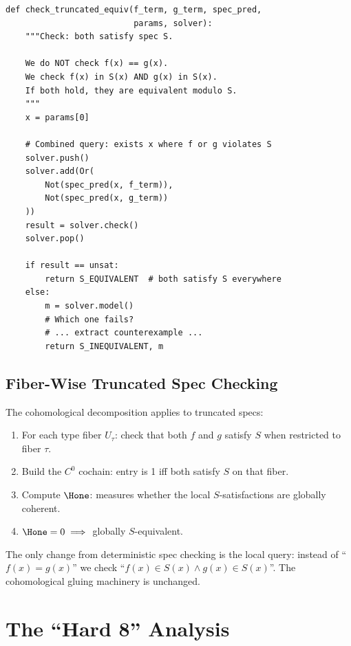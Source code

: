 \begin{lstlisting}[caption={Truncated spec check}]
def check_truncated_equiv(f_term, g_term, spec_pred,
                          params, solver):
    """Check: both satisfy spec S.

    We do NOT check f(x) == g(x).
    We check f(x) in S(x) AND g(x) in S(x).
    If both hold, they are equivalent modulo S.
    """
    x = params[0]

    # Combined query: exists x where f or g violates S
    solver.push()
    solver.add(Or(
        Not(spec_pred(x, f_term)),
        Not(spec_pred(x, g_term))
    ))
    result = solver.check()
    solver.pop()

    if result == unsat:
        return S_EQUIVALENT  # both satisfy S everywhere
    else:
        m = solver.model()
        # Which one fails?
        # ... extract counterexample ...
        return S_INEQUIVALENT, m
\end{lstlisting}

\subsection{Fiber-Wise Truncated Spec Checking}

The cohomological decomposition applies to truncated specs:

\begin{enumerate}
  \item For each type fiber $U_\tau$: check that both $f$ and $g$
    satisfy $S$ when restricted to fiber $\tau$.
  \item Build the $C^0$ cochain: entry is 1 iff both satisfy $S$
    on that fiber.
  \item Compute $\Hone$: measures whether the local $S$-satisfactions
    are globally coherent.
  \item $\Hone = 0 \implies$ globally $S$-equivalent.
\end{enumerate}

The only change from deterministic spec checking is the local query:
instead of ``$f(x) = g(x)$'' we check ``$f(x) \in S(x) \land
g(x) \in S(x)$''.  The cohomological gluing machinery is unchanged.


\section{The ``Hard 8'' Analysis}
\label{sec:hard-8}


